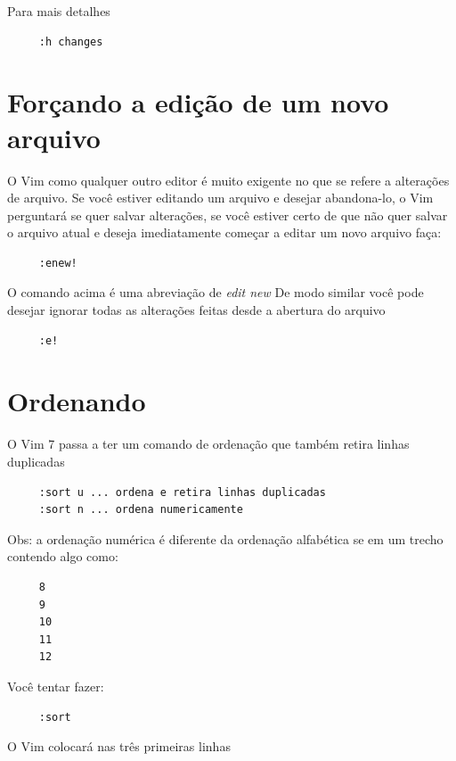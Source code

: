 \documentclass[10pt,a4paper,openany]{book}
\begin{document}
Para mais detalhes

\begin{verbatim}
     :h changes
\end{verbatim}


\section{Forçando a edição de um novo arquivo}\label{sec:Forçando a edição de um novo arquivo}

O Vim como qualquer outro editor é muito exigente no que se refere a alterações
de arquivo.  Se você estiver editando um arquivo e desejar abandona-lo, o Vim
perguntará se quer salvar alterações, se você estiver certo de que não quer
salvar o arquivo atual e deseja imediatamente começar a editar um novo arquivo
faça:

\begin{verbatim}
     :enew!
\end{verbatim}

O comando acima é uma abreviação de {\em edit new} De modo similar você pode
desejar ignorar todas as alterações feitas desde a abertura do arquivo

\begin{verbatim}
     :e!
\end{verbatim}


\section{Ordenando}

O Vim 7 passa a ter um comando de ordenação que também retira linhas
duplicadas

\begin{verbatim}
     :sort u ... ordena e retira linhas duplicadas
     :sort n ... ordena numericamente
\end{verbatim}

Obs: a ordenação numérica é diferente da ordenação alfabética se em um
trecho contendo algo como:

\begin{verbatim}
     8
     9
     10
     11
     12
\end{verbatim}

Você tentar fazer:

\begin{verbatim}
     :sort
\end{verbatim}

O Vim colocará nas três primeiras linhas
\end{document}
